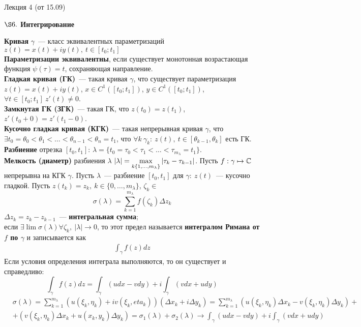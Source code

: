 \LARGE{Лекция 4 (от 15.09)}

\normalsize
\LARGE{\textbf{$\S 6.$ Интегрирование}}
\normalsize

\textbf{Кривая} $\gamma$~--- класс эквивалентных параметризаций $z(t) = x(t) +
iy(t), \ t \in \left[ t_0; t_1 \right]$
\\
\textbf{Параметризации эквивалентны}, если существует монотонная возрастающая
функция $\psi(\tau) = t$, сохраняющая направление.
\\
\textbf{Гладкая кривая (ГК)}~--- такая кривая $\gamma$, что существует параметризация
$z(t) = x(t) + iy(t)$, $x \in C^1 \left( \left[ t_0; t_1 \right] \right)$, $y
\in C^1 \left( \left[ t_0; t_1 \right] \right)$, $\forall t \in \left[ t_0; t_1
\right] \ z'(t) \neq 0$.
\\
\textbf{Замкнутая ГК (ЗГК)}~--- такая ГК, что $z(t_0) = z(t_1)$, $z'(t_0+0) =
z'(t_1-0)$.
\\
\textbf{Кусочно гладкая кривая (КГК)}~--- такая непрерывная кривая $\gamma$, что
$\exists t_0 = \theta_0 < \theta_1 < \dots < \theta_{n-1} < \theta_n = t_1$, что
$\forall k \ \gamma_k: \ z(t), \ t \in [\theta_{k-1}, \theta_k]$ есть ГК.
\\
\textbf{Разбиение} отрезка $\left[ t_0, t_1 \right]$: $\lambda = \{t_0 = \tau_0
< \tau_1 < \dots < \tau_{m_\lambda} = t_1\}$.
\\
\textbf{Мелкость (диаметр)} разбиения $\lambda$ $\left| \lambda \right| = \displaystyle
\max_{k \{1, \dots, m_\lambda\}}\left| \tau_k - \tau_{k-1} \right|$.
\Def Пусть $f: \gamma \mapsto \mathbb{C}$ непрерывна на КГК $\gamma$. Пусть
$\lambda$~--- разбиение $\left[ t_0, t_1 \right]$ для $\gamma: \ z(t)$~---
кусочно гладкой. Пусть $z(t_k) = z_k, \ k \in \{0, \dots, m_\lambda\}$, $\zeta_k
\in$
\[\sigma(\lambda) = \sum_{k = 1}^{m_{\lambda}} f(\zeta_k) \Delta z_k\]
$\Delta z_k = z_k - z_{k-1}$~--- \textbf{интегральная сумма};
\\
если $\exists \lim
\sigma(\lambda) \forall \zeta_k, \ \left| \lambda \right| \to 0$, то этот предел
называется \textbf{интегралом Римана от $f$ по $\gamma$} и записывается как
\begin{align}
  \int_{\gamma}f(z) dz
\end{align}
\theorem
Если условия определения интеграла выполняются, то он существует и \hypertarget{2}{справедливо:}
\[\int_{\gamma}f(z)dz = \int_{\gamma}\left( u dx - v dy \right) + i
    \int_\gamma \left( v dx + u dy \right)\]
\pr
\begin{align*}
  & \sigma(\lambda) = \sum_{k = 1}^{m_\lambda}\left( u(\xi_k, \eta_k) + iv(\xi_k, eta_k) \right)\left( \Delta x_k + i \Delta y_k \right) = \sum_{k = 1}^{m_\lambda}\left( u(\xi_k, \eta_k) \Delta x_k - v(\xi_k, \eta_k) \Delta y_k\right) + \\
  & + \left( v(\xi_k, \eta_k) \Delta x_k + u(x_k, y_k) \Delta y_k\right) = \sigma_1(\lambda) + \sigma_2(\lambda) \to \int_{\gamma}\left( u dx - v dy \right) + i \int_\gamma \left( v dx + u dy \right)
\end{align*}
